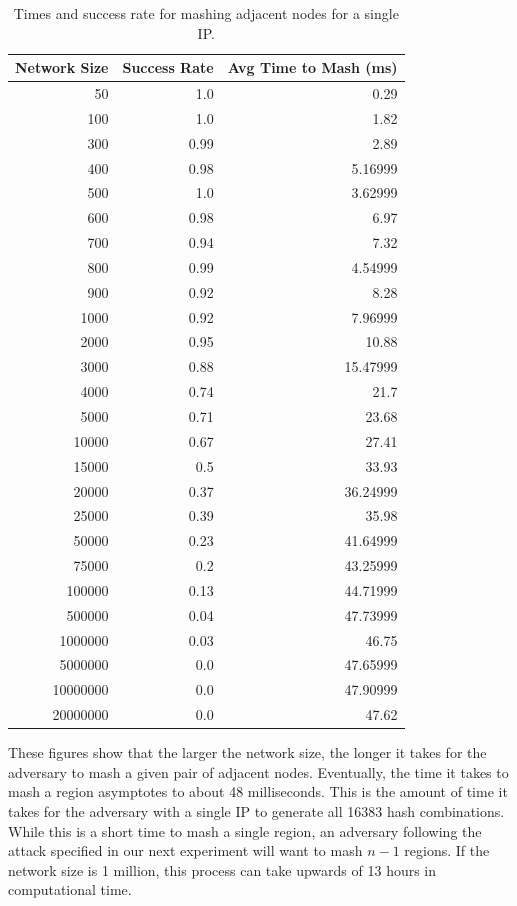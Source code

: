 \documentclass[11pt,conference]{IEEEtran}
\begin{document}
\begin{table}\small
    \centering
    \caption{Times and success rate for mashing adjacent nodes for a single IP.}
    \label{tab:exp1}
\begin{tabular}{|r|r|r|}
    \hline
    Network Size &  Success Rate &  Avg Time to Mash (ms) \\ \hline
    50 & 1.0 & 0.29 \\ \hline
    100 & 1.0 & 1.82 \\ \hline
    300 & 0.99 & 2.89 \\ \hline
    400 & 0.98 & 5.16999 \\ \hline
    500 & 1.0 & 3.62999 \\ \hline
    600 & 0.98 & 6.97 \\ \hline
    700 & 0.94 & 7.32 \\ \hline
    800 & 0.99 & 4.54999 \\ \hline
    900 & 0.92 & 8.28 \\ \hline
    1000 & 0.92 & 7.96999 \\ \hline
    2000 & 0.95 & 10.88 \\ \hline
    3000 & 0.88 & 15.47999 \\ \hline
    4000 & 0.74 & 21.7 \\ \hline
    5000 & 0.71 & 23.68 \\ \hline
    10000 & 0.67 & 27.41 \\ \hline
    15000 & 0.5 & 33.93 \\ \hline
    20000 & 0.37 & 36.24999 \\ \hline
    25000 & 0.39 & 35.98 \\ \hline
    50000 & 0.23 & 41.64999 \\ \hline
    75000 & 0.2 & 43.25999 \\ \hline
    100000 & 0.13 & 44.71999 \\ \hline
    500000 & 0.04 & 47.73999 \\ \hline
    1000000 & 0.03 & 46.75 \\ \hline
    5000000 & 0.0 & 47.65999 \\ \hline
    10000000 & 0.0 & 47.90999 \\ \hline
    20000000 & 0.0 & 47.62 \\ \hline
    
\end{tabular}
\end{table}
These figures show that the larger the network size, the longer it takes for the adversary to mash a given pair of adjacent nodes.
Eventually, the time it takes to mash a region asymptotes to about 48 milliseconds.
This is the amount of time it takes for the adversary with a single IP to generate all 16383 hash combinations.
While this is a short time to mash a single region, an adversary following the attack specified in our next experiment will want to mash $n-1$ regions.
If the network size is 1 million, this process can take upwards of 13 hours in computational time.
\end{document}
